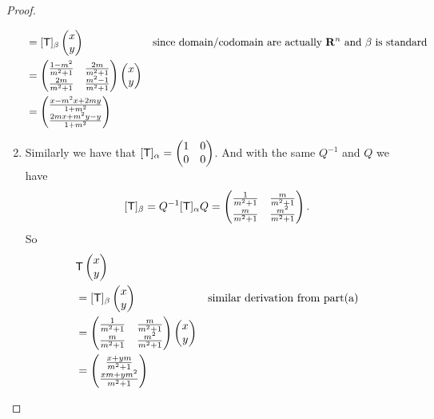 \begin{proof}
\begin{enumerate}
\begin{align*}
    & = [\textsf{T}]_{\beta} \begin{pmatrix} x \\ y \end{pmatrix} & \text{since domain/codomain are actually \(\mathbf{R}^n\) and \(\beta\) is standard} \\
    & = \begin{pmatrix}
            \frac{1 - m^2}{m^2 + 1} & \frac{2m}{m^2 + 1} \\
            \frac{2m}{m^2 + 1} & \frac{m^2 - 1}{m^2 + 1}
        \end{pmatrix}
        \begin{pmatrix} x \\ y \end{pmatrix} \\
    & = \begin{pmatrix}
            \frac{x-m^{2} x+2 m y}{1+m^{2}} \\
            \frac{2 m x+m^{2} y-y}{1+m^{2}}
        \end{pmatrix}
\end{align*}

\item Similarly we have that \([\textsf{T}]_{\alpha} = \begin{pmatrix} 1 & 0 \\ 0 & 0 \end{pmatrix}\).
And with the same \(Q^{-1}\) and \(Q\) we have
\[
    [\textsf{T}]_{\beta} = Q^{-1} [\textsf{T}]_{\alpha} Q = \begin{pmatrix}
        \frac{1}{m^2 + 1} & \frac{m}{m^2 + 1} \\
        \frac{m}{m^2 + 1} & \frac{m^2}{m^2 + 1}
    \end{pmatrix}.
\]
So 
\begin{align*}
    & \textsf{T} \begin{pmatrix} x \\ y \end{pmatrix} \\
    & = [\textsf{T}]_{\beta} \begin{pmatrix} x \\ y \end{pmatrix} & \text{similar derivation from part(a)} \\
    & = \begin{pmatrix}
            \frac{1}{m^2 + 1} & \frac{m}{m^2 + 1} \\
            \frac{m}{m^2 + 1} & \frac{m^2}{m^2 + 1}
        \end{pmatrix}
        \begin{pmatrix} x \\ y \end{pmatrix} \\
    & = \begin{pmatrix}
            \frac{x + ym}{m^{2} + 1} \\
            \frac{xm + ym^2}{m^{2} + 1}
        \end{pmatrix}
\end{align*}

\end{enumerate}
\end{proof}

